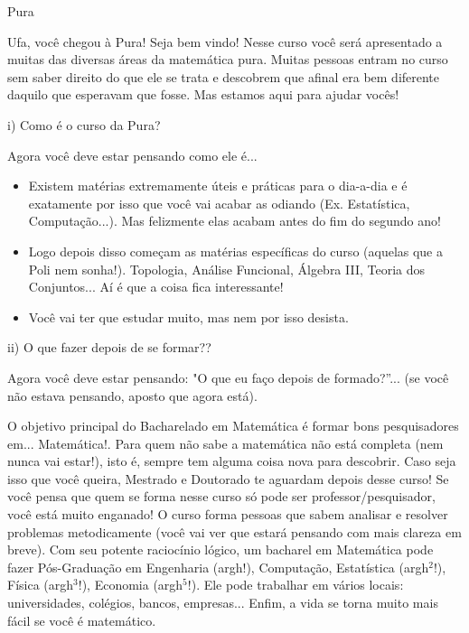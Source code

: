 \begin{subsecao}{Pura}


Ufa, você chegou à Pura! Seja bem vindo! Nesse curso você será apresentado a muitas das diversas áreas da matemática pura. Muitas pessoas entram no curso sem saber direito do que ele se trata e descobrem que afinal era bem diferente daquilo que esperavam que fosse. Mas estamos aqui para ajudar vocês!

i) Como é o curso da Pura?

Agora você deve estar pensando como ele é...
\begin{itemize}


\item  Existem matérias extremamente úteis e práticas para o dia-a-dia e é
exatamente por isso que você vai acabar as odiando (Ex. Estatística, 
Computação...). Mas felizmente elas acabam antes do fim do segundo ano!
\item  Logo depois disso começam as matérias específicas do curso (aquelas que a Poli nem sonha!). Topologia, Análise Funcional, Álgebra III, Teoria dos Conjuntos... Aí é que a coisa fica interessante!
\item  Você vai ter que estudar muito, mas nem por isso desista.

\end{itemize}
ii) O que fazer depois de se formar??

Agora você deve estar pensando: "O que eu faço depois de formado?”... (se você
não estava pensando, aposto que agora está).

O objetivo principal do Bacharelado em Matemática é formar bons pesquisadores em... Matemática!. Para quem não
sabe a matemática não está completa (nem nunca vai estar!), isto é, sempre tem alguma coisa nova para
descobrir. Caso seja isso que você queira, Mestrado e Doutorado te aguardam depois desse curso! Se você pensa que quem se forma nesse curso só pode ser
professor/pesquisador, você está muito enganado! O curso forma pessoas que
sabem analisar e resolver problemas metodicamente (você vai ver que estará
pensando com mais clareza em breve). Com seu potente raciocínio lógico, um
bacharel em Matemática pode fazer Pós-Graduação em Engenharia (argh!),
Computação, Estatística (argh$^2$!), Física (argh$^3$!), Economia (argh$^5$!).
Ele pode trabalhar em vários locais: universidades, colégios, bancos,
empresas... Enfim, a vida se torna muito mais fácil se você é matemático.


\end{subsecao}
